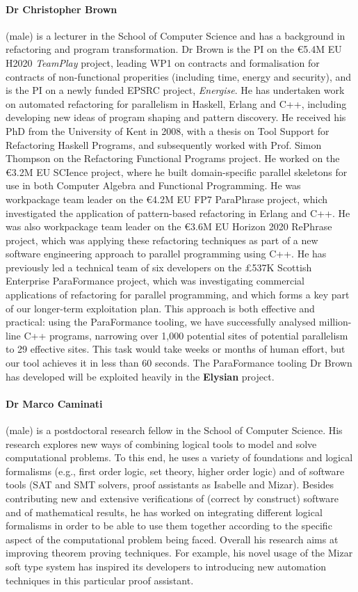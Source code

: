 \documentclass[a4paper,11pt]{article}
\newcommand{\project}[1]{\textbf{#1}\xspace}
\newcommand{\SECURITY}{\project{Elysian}}
\newcommand{\TheProject}{\SECURITY}
\begin{document}
\paragraph{Dr Christopher Brown} (male) is a lecturer in the School of Computer Science and has a background in refactoring and program transformation. Dr Brown is the PI on the \euro{}5.4M EU H2020 \emph{TeamPlay} project, leading WP1 on contracts and formalisation for contracts of non-functional properities (including time, energy and security),
and is the PI on a newly funded EPSRC project, \emph{Energise}. He has undertaken work on automated refactoring for parallelism in Haskell, Erlang and C++, including developing new ideas of program shaping and pattern discovery. He received his PhD from the University of Kent in 2008, with a thesis on Tool Support for Refactoring Haskell Programs, and subsequently worked with Prof. Simon Thompson on the Refactoring Functional Programs project. He worked on the \euro{}3.2M EU SCIence project, where he built domain-specific parallel skeletons for use in both Computer Algebra and Functional Programming. He was workpackage team leader on the \euro{}4.2M EU FP7 ParaPhrase project, which investigated the application of pattern-based refactoring in Erlang and C++. He was also workpackage team leader on the \euro{}3.6M EU Horizon 2020 RePhrase project, which was applying these refactoring techniques as part of a new software engineering approach to parallel programming using C++. He has previously led a technical team of six developers on the £537K Scottish Enterprise ParaFormance project, which was investigating commercial applications of refactoring for parallel programming, and which forms a key part of our longer-term exploitation plan. This approach is both effective and practical: using the ParaFormance tooling, we have successfully analysed million-line C++ programs, narrowing over 1,000 potential sites of potential parallelism to 29 effective sites. This task would take weeks or months of human effort, but our tool achieves it in less than 60 seconds. The ParaFormance tooling Dr Brown has developed will be exploited heavily in the \TheProject{} project. 

\paragraph{Dr Marco Caminati} (male) is a postdoctoral research fellow in the School of Computer Science. 
His research explores new ways of combining logical tools to model and solve computational problems.
To this end, he uses a variety of foundations and logical formalisms (e.g., first order logic, set theory, higher order logic) and of software tools (SAT and SMT solvers, proof assistants as Isabelle and Mizar).
Besides contributing new and extensive verifications of (correct by construct) software and of mathematical results, he has worked on integrating different logical formalisms in order to be able to use them together according to the specific aspect of the computational problem being faced.
Overall his research aims at improving theorem proving techniques. For example, his novel usage of the Mizar soft type system has inspired its developers to introducing new automation techniques in this particular proof assistant.
\end{document}
